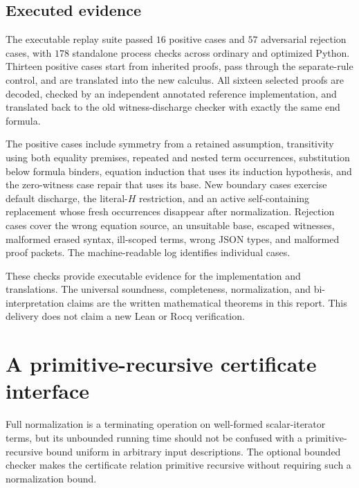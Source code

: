 \documentclass[11pt,a4paper]{article}
\theoremstyle{definition}\newtheorem{definition}[theorem]{Definition}
\theoremstyle{remark}\newtheorem{remark}[theorem]{Remark}
\begin{document}
\subsection{Executed evidence}

The executable replay suite passed $16$ positive cases and $57$ adversarial
rejection cases, with $178$ standalone process checks across ordinary
and optimized Python. Thirteen positive cases start from inherited
proofs, pass through the separate-rule control, and are translated into
the new calculus. All sixteen selected proofs are decoded, checked by an
independent annotated reference implementation, and translated back to
the old witness-discharge checker with exactly the same end formula.

The positive cases include symmetry from a retained assumption,
transitivity using both equality premises, repeated and nested term
occurrences, substitution below formula binders, equation induction that
uses its induction hypothesis, and the zero-witness case repair that
uses its base. New boundary cases exercise default discharge, the
literal-$H$ restriction, and an active self-containing replacement whose
fresh occurrences disappear after normalization. Rejection cases cover
the wrong equation source, an unsuitable base, escaped witnesses,
malformed erased syntax, ill-scoped terms, wrong JSON types, and malformed
proof packets. The machine-readable log identifies individual cases.

These checks provide executable evidence for the implementation and
translations. The universal soundness, completeness, normalization, and
bi-interpretation claims are the written mathematical theorems in this
report. This delivery does not claim a new Lean or Rocq verification.


\section{A primitive-recursive certificate interface}
\label{sec:fuel-interface}

Full normalization is a terminating operation on well-formed scalar-iterator
terms, but its unbounded running time should not be confused with a
primitive-recursive bound uniform in arbitrary input descriptions. The
optional bounded checker makes the certificate relation primitive recursive
without requiring such a normalization bound.
\end{document}
